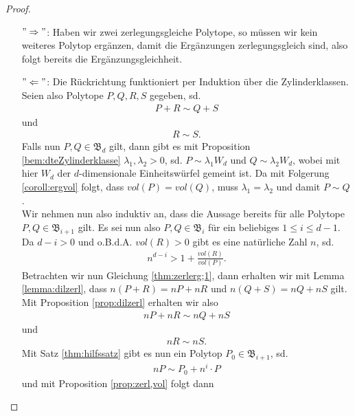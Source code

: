\documentclass[11pt,titlepage]{article}
\theoremstyle{definition}
\theoremstyle{remark}
\begin{document}
	\begin{proof}
		\noindent
		\begin{itemize}
			\item[$"\Rightarrow"$:] Haben wir zwei zerlegungsgleiche Polytope, so müssen wir kein weiteres Polytop ergänzen, damit die Ergänzungen zerlegungsgleich sind, also folgt bereits die Ergänzungsgleichheit.
			
			\item[$"\Leftarrow"$:] Die Rückrichtung funktioniert per 
			Induktion über die Zylinderklassen. Seien also Polytope 
			$P,Q,R,S$ gegeben, sd. 
			\begin{align}
			P+R\sim Q+S \label{thm:zerlerg;1}
			\end{align}
			und
			\begin{align}
			R\sim S. \label{thm:zerlerg;2}
			\end{align}
			Falls nun $P,Q\in \mathfrak{B}_d$ gilt, dann gibt es mit 
			Proposition \ref{bem:dteZylinderklasse} 
			$\lambda_1,\lambda_2 >0$, sd. $P\sim \lambda_1 W_d$ und 
			$Q\sim \lambda_2 W_d$, wobei mit hier $W_d$ der $d$-dimensionale 
			Einheitswürfel gemeint ist. Da mit Folgerung \ref{coroll:ergvol} 
			folgt, dass $vol(P)=vol(Q)$, muss $\lambda_1 =\lambda_2$ und 
			damit $P\sim Q$. \\
			Wir nehmen nun also induktiv an, dass die Aussage bereits für alle 
			Polytope $P,Q\in\mathfrak{B}_{i+1}$ gilt. Es sei nun also 
			$P,Q\in\mathfrak{B}_i$ für ein beliebiges $1\leq i\leq d-1$. 
			Da $d-i>0$ und o.B.d.A. $vol(R)>0$ gibt es eine natürliche Zahl $n$, sd. 
			\begin{align}
			n^{d-i}>1+\frac{vol(R)}{vol(P)}. \label{thm:zerlerg;3}
			\end{align}
			Betrachten wir nun Gleichung \ref{thm:zerlerg;1}, dann erhalten wir 
			mit Lemma \ref{lemma:dilzerl}, dass $n(P+R)=nP+nR$ und $n(Q+S)=nQ+nS$ 
			gilt. Mit Proposition \ref{prop:dilzerl} erhalten wir also
			\begin{align}
			nP+nR\sim nQ+nS \label{thm:zerlerg;4}
			\end{align}
			und
			\begin{align}
			nR\sim nS. \label{thm:zerlerg;5}
			\end{align}
			Mit Satz \ref{thm:hilfssatz} gibt es nun ein Polytop 
			$P_0\in\mathfrak{B}_{i+1}$, sd.
			\begin{align}
			nP\sim P_0 +n^i\cdot P \label{thm:zerlerg;6}
			\end{align}
			und mit Proposition \ref{prop:zerl,vol} folgt dann

\end{itemize}
\end{proof}
\end{document}
